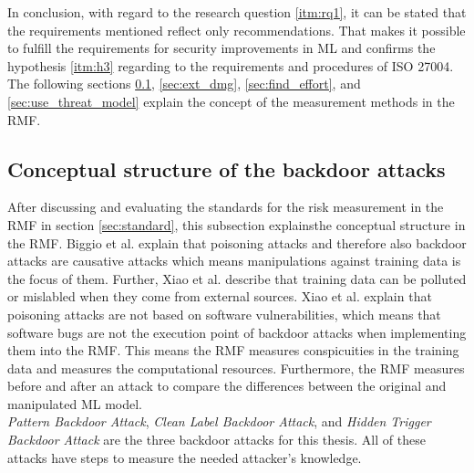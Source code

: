 In conclusion, with regard to the research question \ref{itm:rq1}, it can be stated that the requirements mentioned reflect only recommendations. That makes it possible to fulfill the requirements for security improvements in ML and confirms the hypothesis \ref{itm:h3} regarding to the requirements and procedures of ISO 27004. The following sections \ref{sec:charac_backdoor}, \ref{sec:ext_dmg}, \ref{sec:find_effort}, and \ref{sec:use_threat_model} explain the concept of the measurement methods in the RMF.

\subsection{Conceptual structure of the backdoor attacks}
\label{sec:charac_backdoor}

After discussing and evaluating the standards for the risk measurement in the RMF in section \ref{sec:standard}, this subsection explainsthe conceptual structure in the RMF. Biggio et al. \cite{DBLP:conf/icml/BiggioNL12} explain that poisoning attacks and therefore also backdoor attacks are causative attacks which means manipulations against training data is the focus of them. Further, Xiao et al. \cite{DBLP:conf/sp/XiaoLZX18} describe that training data can be polluted or mislabled when they come from external sources. Xiao et al. explain that poisoning attacks are not based on software vulnerabilities, which means that software bugs are not the execution point of backdoor attacks when implementing them into the RMF. This means the RMF measures conspicuities in the training data and measures the computational resources. Furthermore, the RMF measures before and after an attack to compare the differences between the original and manipulated ML model. \\
\textit{Pattern Backdoor Attack}, \textit{Clean Label Backdoor Attack}, and \textit{Hidden Trigger Backdoor Attack} are the three backdoor attacks for this thesis. All of these attacks have steps to measure the needed attacker's knowledge. \\ \\
